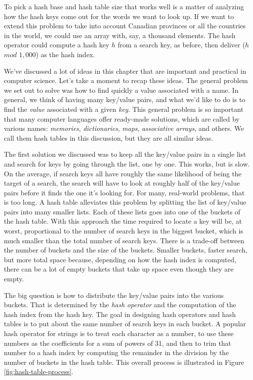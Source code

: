 To pick a hash base and hash table size
that works well is a matter of analyzing how
the hash keys come out for the words we want to look up.
If we want to extend this problem to take into
account Canadian provinces or all the countries in the world, we could
use an array with, say, a thousand elements.
The hash operator could compute a hash key $h$ from a search key,
as before, then deliver ($h$ $mod$ $1,000$) as the hash index.

We've discussed a lot of ideas in this chapter
that are important and practical in computer science.
Let's take a moment to recap these ideas.
The general problem we set out to solve was how to find quickly a value
associated with a name. In general, we think of having many key/value pairs,
and what we'd like to do is to find the \emph{value} associated with a given
\emph{key}. This general problem is so important that many computer languages
offer ready-made solutions, which are called by
various names: \emph{memories}, \emph{dictionaries},
\emph{maps}, \emph{associative arrays}, and others.
We call them hash tables in this discussion,
but they are all similar ideas.

The first solution we discussed was
to keep all the key/value pairs in a single list
and search for keys by going through the list, one by one.
This works, but is slow.
On the average, if search keys all have roughly the same likelihood of
being the target of a search,
the search will have to look at roughly half
of the key/value pairs before it finds the one it's looking for.
For many, real-world problems, that is too long.
A hash table alleviates this problem
by splitting the list of key/value pairs into many smaller lists.
Each of these lists goes into one of the buckets of the hash table.
With this approach the time required to locate a key
will be, at worst, proportional
to the number of search keys in the biggest bucket,
which is much smaller than the total number of search keys.
There is a trade-off between the number of buckets and the size of the buckets.
Smaller buckets, faster search, but more total space because,
depending on how the hash index is computed,
there can be a lot of empty buckets
that take up space even though they are empty.

The big question is how to distribute the key/value pairs into the various buckets.
That is determined by the \emph{hash operator} and
the computation of the hash index from the hash key. 
The goal in designing hash operators and hash tables
is to put about the same number of search keys in each bucket.
A popular hash operator for
strings is to treat each character as a number, to use these numbers as the
coefficients for a sum of powers of 31, and then to trim that number to
a hash index by computing the remainder in the division by
the number of buckets in the hash table.
This overall process is illustrated in Figure \ref{fig:hash-table-process}.

